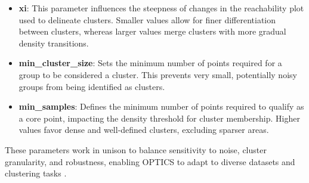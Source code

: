 \begin{itemize}
    \item \textbf{xi}: This parameter influences the steepness of changes in the reachability plot used to
    delineate clusters. Smaller values allow for finer differentiation between clusters, whereas larger values merge
     clusters with more gradual density transitions.
    \item \textbf{min\_cluster\_size}: Sets the minimum number of points required for a group to be considered
     a cluster. This prevents very small, potentially noisy groups from being identified as clusters.
    \item \textbf{min\_samples}: Defines the minimum number of points required to qualify as a core point,
    impacting the density threshold for cluster membership. Higher values favor dense and well-defined clusters,
    excluding sparser areas.
\end{itemize}

These parameters work in unison to balance sensitivity to noise, cluster granularity, and robustness, enabling OPTICS
to adapt to diverse datasets and clustering tasks \cite{scikit-learn-optics}.
